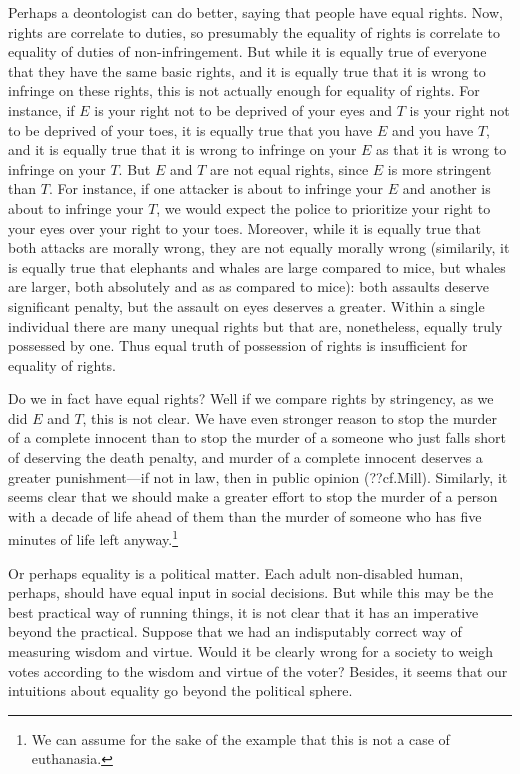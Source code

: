 Perhaps a deontologist can do better, saying that people have equal rights. Now, rights are correlate to duties, so presumably the
equality of rights is correlate to equality of duties of non-infringement. But while it is 
equally true of everyone that they have the same basic rights, and it is equally true that it is
wrong to infringe on these rights, this is not actually enough for equality of rights. For instance, 
if $E$ is your right not to be deprived of your eyes and $T$ is your right not to be deprived of your toes, 
it is equally true that you have $E$ and you have $T$, and it is equally true that it is wrong to 
infringe on your $E$ as that it is wrong to infringe on your $T$. But $E$ and $T$ are not equal rights, since
$E$ is more stringent than $T$. For instance, if one attacker is about to infringe your $E$ and another is about
to infringe your $T$, we would expect the police to prioritize your right to your eyes over your right to your
toes. Moreover, while it is equally true that both attacks are morally wrong, they are not equally morally wrong 
(similarily, it is equally true that elephants and whales are large compared to mice, but whales are larger, both
absolutely and as as compared to mice): both assaults deserve significant penalty, but the assault on eyes deserves
a greater. Within a single individual there are many unequal rights but that are, nonetheless, equally truly possessed
by one. Thus equal truth of possession of rights is insufficient for equality of rights.

Do we in fact have equal rights? Well if we compare rights by stringency, as we did $E$ and $T$, this is not clear.
We have even stronger reason to stop the murder of a complete innocent than to stop the murder of a someone who just falls
short of deserving the death penalty, and murder of a complete innocent deserves a greater punishment---if not in law, then
in public opinion (??cf.Mill). Similarly, it seems clear that we should make a greater effort to stop the murder of a person
with a decade of life ahead of them than the murder of someone who has five minutes of life left anyway.\footnote{We can assume
for the sake of the example that this is not a case of euthanasia.} 

Or perhaps equality is a political matter. Each adult non-disabled human, perhaps, should have equal 
input in social decisions. But while this may be the best practical way of running things, it is not
clear that it has an imperative beyond the practical. Suppose that we had an indisputably correct way
of measuring wisdom and virtue. Would it be clearly wrong for a society to weigh votes according to 
the wisdom and virtue of the voter? Besides, it seems that our intuitions about equality go beyond
the political sphere.

